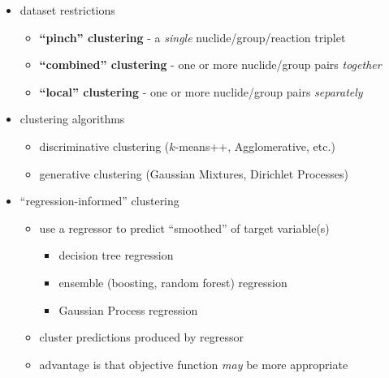 \begin{itemize}[noitemsep]
  \item dataset restrictions
  \begin{itemize}[noitemsep]
    \item \textbf{``pinch'' clustering} - a \textit{single} nuclide/group/reaction triplet
    \item \textbf{``combined'' clustering} - one or more nuclide/group pairs \textit{together}
    \item \textbf{``local'' clustering} - one or more nuclide/group pairs \textit{separately}
  \end{itemize}
  \item clustering algorithms
  \begin{itemize}[noitemsep]
    \item discriminative clustering ($k$-means++, Agglomerative, etc.)
    \item generative clustering (Gaussian Mixtures, Dirichlet Processes)
  \end{itemize}
  \item ``regression-informed'' clustering
  \begin{itemize}[noitemsep]
    \item use a regressor to predict ``smoothed'' of target variable(s)
    \begin{itemize}[noitemsep]
      \item decision tree regression
      \item ensemble (boosting, random forest) regression
      \item Gaussian Process regression
    \end{itemize}
    \item cluster predictions produced by regressor
    \item advantage is that objective function \textit{may} be more appropriate
  \end{itemize}
\end{itemize}